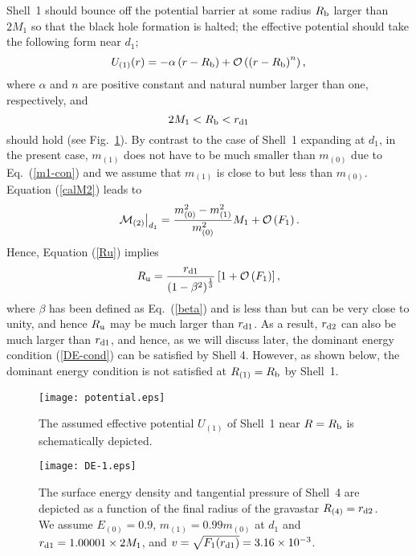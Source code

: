 \documentclass[aps,preprint,preprintnumber,nofootinbib,amsmath,amssymb,ascmac,bm,12pt]{revtex4}
\newcommand{\rdo}{r_{\rm d1}}
\newcommand{\rdt}{r_{\rm d2}}
\newcommand{\Rb}{R_{\rm b}}
\newcommand{\Rf}{R_{\rm f}}
\newcommand{\Ru}{R_{\rm u}}
\newcommand{\mz}{m_{(0)}}
\newcommand{\mo}{m_{(1)}}
\newcommand{\Ron}{R_{(1)}}
\newcommand{\Rfo}{R_{(4)}}
\newcommand{\Uon}{U_{(1)}}
\newcommand{\Eze}{E_{(0)}}
\begin{document}
Shell~1 should bounce off the potential barrier at  some radius $\Rb$ larger than $2M_1$ 
so that the black hole formation is halted; the effective potential should take 
the following form near $d_1$;
\begin{equation}
\Uon(r)=-\alpha \left(r-\Rb\right)+{\cal O}\left(\left(r-\Rb\right)^{n}\right), \label{U1-2}
 \end{equation}
 where $\alpha$ and $n$ are positive constant and natural number larger than one, respectively, and  
 \begin{equation}
 2M_1<\Rb<\rdo \label{r-order}
 \end{equation}
 should hold (see Fig.~\ref{fig-potential}). 
 By contrast to the case of Shell~1 expanding at $d_1$, in the present case,  
 $\mo$ does not have to be much smaller than $\mz$ due to Eq.~(\ref{m1-con}) and we assume that 
 $\mo$ is close to but less than $\mz$.  
 Equation (\ref{calM2}) leads to 
\begin{align}
\left.{\cal M}_{(2)}\right|_{d_1}= \frac{\mz^2-\mo^2}{\mz^2}M_1+{\cal O}\left(F_1\right). %
\end{align}
Hence, Equation (\ref{Ru}) implies 
$$
\Ru=\frac{\rdo}{\left(1-\beta^2\right)^{1\over3}} \left[1+{\cal O}\left(F_1\right)\right],
$$ 
where $\beta$ has been defined as Eq.~(\ref{beta}) and is less than but can be very close to unity, 
and hence $\Ru$ may be much larger than $\rdo$. As a result, $\rdt$ can also be much larger than $\rdo$, 
and hence, as we will discuss later, the dominant energy condition (\ref{DE-cond}) can be satisfied by Shell 4. 
However,  as shown below, the dominant energy condition is not satisfied at $\Ron=\Rb$ by Shell~1. 

\begin{figure}[htbp]
 \begin{center}
 \texttt{[image: potential.eps]}
 \end{center}
 \caption{
The assumed effective potential $U_{(1)}$ of Shell~1 near $R=R_{\rm b}$ is schematically 
depicted.  }
 \label{fig-potential}
\end{figure}

\begin{figure}[htbp]
 \begin{center}
 \texttt{[image: DE-1.eps]}
 \end{center}
 \caption{
The surface energy density and tangential pressure of Shell~4  
are depicted as a function of the final radius of the gravastar $\Rfo=\rdt$. 
We assume $\Eze=0.9$, $\mo=0.99\mz$ at $d_1$ and $\rdo=1.00001\times 2M_1$, and 
$v=\sqrt{F_1(\rdo)}=3.16\times10^{-3}$. }
 \label{fig-DE-1}
\end{figure}
\end{document}
